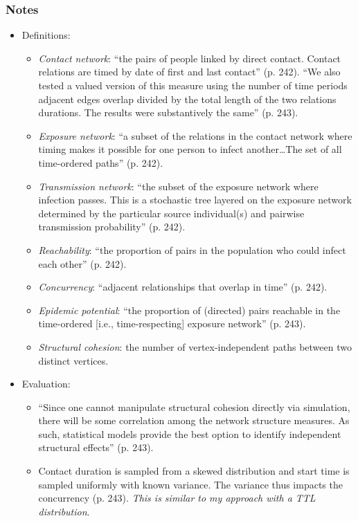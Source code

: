 \subsubsection*{Notes}
\begin{itemize}
\item Definitions:
    \begin{itemize}
        \item \emph{Contact network}: ``the pairs of people linked by direct contact. Contact relations are timed by date of first and last contact'' (p. 242). ``We also tested a valued version of this measure using the number of time periods adjacent edges overlap divided by the total length of the two relations durations. The results were substantively the same'' (p. 243).
        \item \emph{Exposure network}: ``a subset of the relations in the contact network where timing makes it possible for one person to infect another{\ldots}The set of all time-ordered paths'' (p. 242).
        \item \emph{Transmission network}: ``the subset of the exposure network where infection passes. This is a stochastic tree layered on the exposure network determined by the particular source individual(s) and pairwise transmission probability'' (p. 242).
        \item \emph{Reachability}: ``the proportion of pairs in the population who could infect each other'' (p. 242).
        \item \emph{Concurrency}: ``adjacent relationships that overlap in time'' (p. 242).
        \item \emph{Epidemic potential}: ``the proportion of (directed) pairs reachable in the time-ordered [i.e., time-respecting] exposure network'' (p. 243).
        \item \emph{Structural cohesion}: the number of vertex-independent paths between two distinct vertices.
    \end{itemize}
\item Evaluation:
    \begin{itemize}
        \item ``Since one cannot manipulate structural cohesion directly via simulation, there will be some correlation among the network structure measures. As such, statistical models provide the best option to identify independent structural effects'' (p. 243).
        \item Contact duration is sampled from a skewed distribution and start time is sampled uniformly with known variance. The variance thus impacts the concurrency (p. 243). \emph{This is similar to my approach with a TTL distribution}.

\end{itemize}
\end{itemize}
